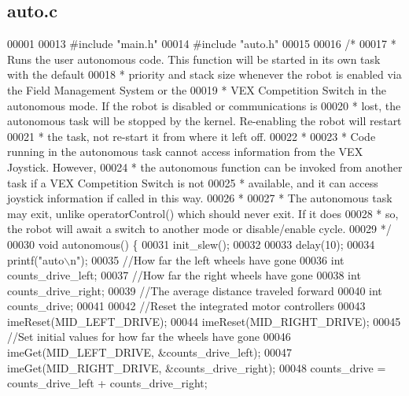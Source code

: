 \subsection{auto.\+c}
\label{auto_8c_source}

\begin{DoxyCode}
00001 
00013 \textcolor{preprocessor}{#include "main.h"}
00014 \textcolor{preprocessor}{#include "auto.h"}
00015 
00016 \textcolor{comment}{/*}
00017 \textcolor{comment}{ * Runs the user autonomous code. This function will be started in its own task with the default}
00018 \textcolor{comment}{ * priority and stack size whenever the robot is enabled via the Field Management System or the}
00019 \textcolor{comment}{ * VEX Competition Switch in the autonomous mode. If the robot is disabled or communications is}
00020 \textcolor{comment}{ * lost,  the autonomous task will be stopped by the kernel. Re-enabling the robot will restart}
00021 \textcolor{comment}{ * the task, not re-start it from where it left off.}
00022 \textcolor{comment}{ *}
00023 \textcolor{comment}{ * Code running in the autonomous task cannot access information from the VEX Joystick. However,}
00024 \textcolor{comment}{ * the autonomous function can be invoked from another task if a VEX Competition Switch is not}
00025 \textcolor{comment}{ * available, and it can access joystick information if called in this way.}
00026 \textcolor{comment}{ *}
00027 \textcolor{comment}{ * The autonomous task may exit, unlike operatorControl() which should never exit. If it does}
00028 \textcolor{comment}{ * so, the robot will await a switch to another mode or disable/enable cycle.}
00029 \textcolor{comment}{ */}
00030 \textcolor{keywordtype}{void} autonomous() \{
00031   init_slew();
00032 
00033   delay(10);
00034   printf(\textcolor{stringliteral}{"auto\(\backslash\)n"});
00035   \textcolor{comment}{//How far the left wheels have gone}
00036   \textcolor{keywordtype}{int} counts\_drive\_left;
00037   \textcolor{comment}{//How far the right wheels have gone}
00038   \textcolor{keywordtype}{int} counts\_drive\_right;
00039   \textcolor{comment}{//The average distance traveled forward}
00040   \textcolor{keywordtype}{int} counts\_drive;
00041 
00042   \textcolor{comment}{//Reset the integrated motor controllers}
00043   imeReset(MID_LEFT_DRIVE);
00044   imeReset(MID_RIGHT_DRIVE);
00045   \textcolor{comment}{//Set initial values for how far the wheels have gone}
00046   imeGet(MID_LEFT_DRIVE, &counts\_drive\_left);
00047   imeGet(MID_RIGHT_DRIVE, &counts\_drive\_right);
00048   counts\_drive = counts\_drive\_left + counts\_drive\_right;

\end{DoxyCode}
